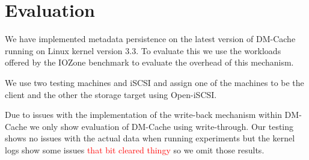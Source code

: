 \section{Evaluation}
\label{sec:evaluation}

We have implemented metadata persistence on the latest version of
DM-Cache running on Linux kernel version 3.3. To evaluate this we use
the workloads offered by the IOZone benchmark to evaluate the overhead
of this mechanism.

We use two testing machines and iSCSI and assign one of the machines
to be the client and the other the storage target using Open-iSCSI.

Due to issues with the implementation of the write-back mechanism
within DM-Cache we only show evaluation of DM-Cache using
write-through. Our testing shows no issues with the actual data when
running experiments but the kernel logs show some issues
\textcolor{red}{that bit cleared thingy} so we omit those results.
